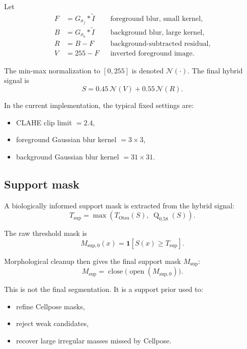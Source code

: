 \documentclass[11pt]{article}
\newcommand{\1}{\mathbf{1}}
\newcommand{\quantile}{\operatorname{Q}}
\newcommand{\openop}{\operatorname{open}}
\newcommand{\closeop}{\operatorname{close}}
\newcommand{\normminmax}{\mathcal{N}}
\newcommand{\support}{M_{\mathrm{sup}}}
\newcommand{\signal}{S}
\begin{document}
Let
\begin{align}
F &= G_{\sigma_f} * \tilde{I} && \text{foreground blur, small kernel},\\
B &= G_{\sigma_b} * \tilde{I} && \text{background blur, large kernel},\\
R &= B - F && \text{background-subtracted residual},\\
V &= 255 - F && \text{inverted foreground image}.
\end{align}

The min-max normalization to $[0,255]$ is denoted $\normminmax(\cdot)$. The final hybrid signal is
\begin{equation}
\signal = 0.45\,\normminmax(V) + 0.55\,\normminmax(R).
\end{equation}

In the current implementation, the typical fixed settings are:
\begin{itemize}[leftmargin=1.5em]
  \item CLAHE clip limit $=2.4$,
  \item foreground Gaussian blur kernel $=3\times3$,
  \item background Gaussian blur kernel $=31\times31$.
\end{itemize}

\subsection{Support mask}
A biologically informed support mask is extracted from the hybrid signal:
\begin{equation}
T_{\mathrm{sup}} = \max\left(T_{\mathrm{Otsu}}(\signal),\; \quantile_{0.58}(\signal)\right).
\end{equation}

The raw threshold mask is
\begin{equation}
M_{\mathrm{sup},0}(x)=\1[\signal(x)\ge T_{\mathrm{sup}}].
\end{equation}

Morphological cleanup then gives the final support mask $\support$:
\begin{equation}
\support = \closeop\bigl(\openop(M_{\mathrm{sup},0})\bigr).
\end{equation}

This is not the final segmentation. It is a support prior used to:
\begin{itemize}[leftmargin=1.5em]
  \item refine Cellpose masks,
  \item reject weak candidates,
  \item recover large irregular masses missed by Cellpose.
\end{itemize}
\end{document}
